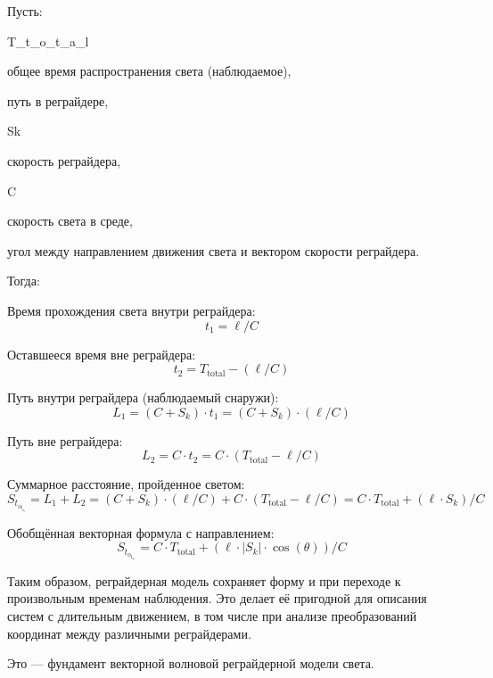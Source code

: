 \documentclass[12pt]{article}
\begin{document}
Пусть:
\par
T_t_o_t_a_l 
\par
общее время распространения света (наблюдаемое),
\par
\ell
\par 
путь в реграйдере,
\par
Sk 
\par
скорость реграйдера,
\par
C 
\par
скорость света в среде,
\par
\theta
\par 
угол между направлением движения света и вектором скорости реграйдера.
\par
Тогда:

Время прохождения света внутри реграйдера:
\[
t_1 = \ell / C
\]

Оставшееся время вне реграйдера:
\[
t_2 = T_{\text{total}} - (\ell / C)
\]

Путь внутри реграйдера (наблюдаемый снаружи):
\[
L_1 = (C + S_k) \cdot t_1 = (C + S_k) \cdot (\ell / C)
\]

Путь вне реграйдера:
\[
L_2 = C \cdot t_2 = C \cdot (T_{\text{total}} - \ell / C)
\]

Суммарное расстояние, пройденное светом:
\[
S_t_o_t_a_l = L_1 + L_2 = (C + S_k) \cdot (\ell / C) + C \cdot (T_{\text{total}} - \ell / C) = C \cdot T_{\text{total}} + (\ell \cdot S_k) / C
\]

Обобщённая векторная формула с направлением:
\[
S_t_o_t_a_l = C \cdot T_{\text{total}} + (\ell \cdot \left|S_k\right| \cdot \cos(\theta)) / C
\]

Таким образом, реграйдерная модель сохраняет форму и при переходе к произвольным временам наблюдения. Это делает её пригодной для описания систем с длительным движением, в том числе при анализе преобразований координат между различными реграйдерами.

Это — фундамент векторной волновой реграйдерной модели света.
\end{document}
